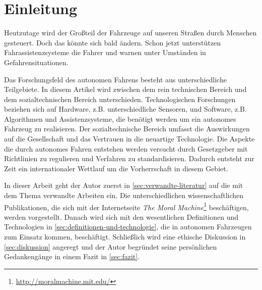 \section{Einleitung}

Heutzutage wird der Großteil der Fahrzeuge auf unseren Straßen durch Menschen gesteuert. Doch das könnte sich bald ändern. Schon jetzt unterstützen Fahrassistenzsysteme die Fahrer und warnen unter Umständen in Gefahrensituationen.

Das Forschungsfeld des autonomen Fahrens besteht aus unterschiedliche Teilgebiete. In diesem Artikel wird zwischen dem rein technischen Bereich und dem sozialtechnischen Bereich unterschieden. Technologischen Forschungen beziehen sich auf Hardware, z.B. unterschiedliche Sensoren, und Software, z.B. Algorithmen und Assistenzsysteme, die benötigt werden um ein autonomes Fahrzeug zu realisieren. Der sozialtechnische Bereich umfasst die Auswirkungen auf die Gesellschaft und das Vertrauen in die neuartige Technologie. Die Aspekte die durch autonomes Fahren entstehen werden versucht durch Gesetzgeber mit Richtlinien zu regulieren und Verfahren zu standardisieren. Dadurch entsteht zur Zeit ein internationaler Wettlauf um die Vorherrschaft in diesem Gebiet.

In dieser Arbeit geht der Autor zuerst in \ref{sec:verwandte-literatur} auf die mit dem Thema verwandte Arbeiten ein. Die unterschiedlichen wissenschaftlichen Publikationen, die sich mit der Internetseite \textit{The Moral Machine}\footnote{\url{http://moralmachine.mit.edu/}} beschäftigen, werden vorgestellt. Danach wird sich mit den wesentlichen Definitionen und Technologien in \ref{sec:definitionen-und-technologie}, die in autonomen Fahrzeugen zum Einsatz kommen,  beschäftigt. Schließlich wird eine ethische Diskussion in \ref{sec:diskussion} angeregt und der Autor begründet seine persönlichen Gedankengänge in einem Fazit in \ref{sec:fazit}.
